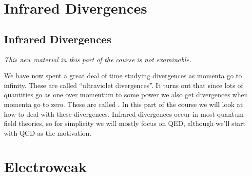 \documentclass[fleqn]{NotesClass}
\newcommand{\amplitude}{\symcal{A}}
\begin{document}
    \part{Infrared Divergences}
    \chapter{Infrared Divergences}
    \textit{This new material in this part of the course is not examinable.}
    
    We have now spent a great deal of time studying divergences as momenta go to infinity.
    These are called \enquote{ultraviolet divergences}.
    It turns out that since lots of quantities go as one over momentum to some power we also get divergences when momenta go to zero.
    These are called .
    In this part of the course we will look at how to deal with these divergences.
    Infrared divergences occur in most quantum field theories, so for simplicity we will mostly focus on QED, although we'll start with QCD as the motivation.
    
    
    
    
    
    
    
    
    
    \renewcommand{\amplitude}{\symcal{M}}    
    
    
    
    
    
    
    
    
    
    
    
    
    
    
    
    \part{Electroweak}
\end{document}
